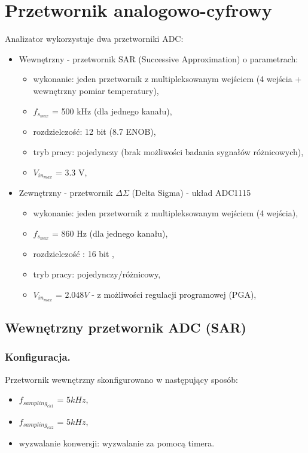 \section{Przetwornik analogowo-cyfrowy}
Analizator wykorzystuje dwa przetworniki ADC:
\begin{itemize}
    \item Wewnętrzny - przetwornik SAR (Successive Approximation) o parametrach:
        \begin{itemize}
            \item wykonanie: jeden przetwornik z multipleksowanym wejściem (4 wejścia + wewnętrzny pomiar temperatury),
            \item $f_{s_{max}}$ = 500 kHz (dla jednego kanału),
            \item rozdzielczość: 12 bit (8.7 ENOB),
            \item tryb pracy: pojedynczy (brak możliwości badania sygnałów różnicowych),
            \item $V_{in_{max}}$ = 3.3 V,
        \end{itemize}
        
    \item Zewnętrzny - przetwornik $\Delta\Sigma$ (Delta Sigma) - układ ADC1115
        \begin{itemize}
            \item wykonanie: jeden przetwornik z multipleksowanym wejściem (4 wejścia),
            \item $f_{s_{max}}$ = 860 Hz (dla jednego kanału),
            \item rozdzielczość : 16 bit ,
            \item tryb pracy: pojedynczy/różnicowy,
            \item $V_{in_{max}}$ = $2.048V$ - z możliwości regulacji programowej (PGA),
        \end{itemize}
\end{itemize}

\subsection{Wewnętrzny przetwornik ADC (SAR)}
\subsubsection{Konfiguracja.}
Przetwornik wewnętrzny skonfigurowano w następujący sposób:
    \begin{itemize}
        \item $f_{sampling_{ch1}}$ = $5kHz$, 
        \item $f_{sampling_{ch2}}$ = $5kHz$,
        \item wyzwalanie konwersji: wyzwalanie za pomocą timera.
    \end{itemize}

